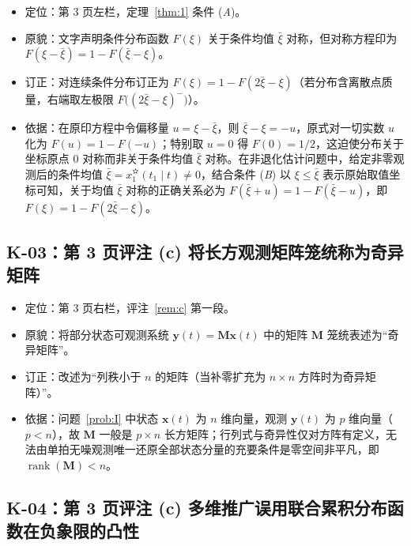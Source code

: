 \begin{itemize}
\item 定位：第 3 页左栏，定理~\ref{thm:1} 条件 (\emph{A})。
\item 原貌：文字声明条件分布函数 $F(\xi)$ 关于条件均值 $\bar{\xi}$ 对称，但对称方程印为 $F(\xi - \bar{\xi}) = 1 - F(\bar{\xi} - \xi)$。
\item 订正：对连续条件分布订正为 $F(\xi) = 1 - F(2\bar{\xi} - \xi)$（若分布含离散点质量，右端取左极限 $F\bigl((2\bar{\xi} - \xi)^{-}\bigr)$）。
\item 依据：在原印方程中令偏移量 $u = \xi - \bar{\xi}$，则 $\bar{\xi} - \xi = -u$，原式对一切实数 $u$ 化为 $F(u) = 1 - F(-u)$；特别取 $u = 0$ 得 $F(0) = 1/2$，这迫使分布关于坐标原点 $0$ 对称而非关于条件均值 $\bar{\xi}$ 对称。在非退化估计问题中，给定非零观测后的条件均值 $\bar{\xi} = x_1^{\text{✫}}(t_1 \mid t) \neq 0$，结合条件 (\emph{B}) 以 $\xi \leq \bar{\xi}$ 表示原始取值坐标可知，关于均值 $\bar{\xi}$ 对称的正确关系必为 $F(\bar{\xi} + u) = 1 - F(\bar{\xi} - u)$，即 $F(\xi) = 1 - F(2\bar{\xi} - \xi)$。
\end{itemize}

\subsection{K-03：第 3 页评注 (c) 将长方观测矩阵笼统称为奇异矩阵}\label{sec:k03}

\begin{itemize}
\item 定位：第 3 页右栏，评注~\ref{rem:c} 第一段。
\item 原貌：将部分状态可观测系统 $\bm{y}(t) = \bm{M}\bm{x}(t)$ 中的矩阵 $\bm{M}$ 笼统表述为“奇异矩阵”。
\item 订正：改述为“列秩小于 $n$ 的矩阵（当补零扩充为 $n \times n$ 方阵时为奇异矩阵）”。
\item 依据：问题~\ref{prob:I} 中状态 $\bm{x}(t)$ 为 $n$ 维向量，观测 $\bm{y}(t)$ 为 $p$ 维向量（$p < n$），故 $\bm{M}$ 一般是 $p \times n$ 长方矩阵；行列式与奇异性仅对方阵有定义，无法由单拍无噪观测唯一还原全部状态分量的充要条件是零空间非平凡，即 $\operatorname{rank}(\bm{M}) < n$。
\end{itemize}

\subsection{K-04：第 3 页评注 (c) 多维推广误用联合累积分布函数在负象限的凸性}\label{sec:k04}

